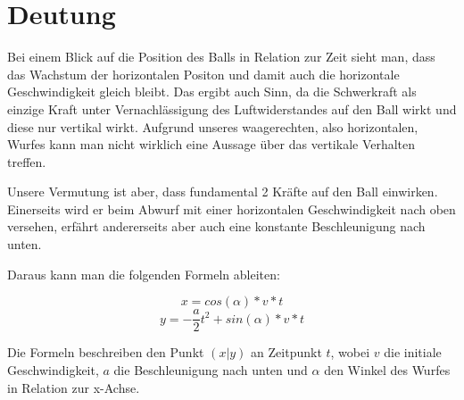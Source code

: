 \documentclass[8pt, letterpaper]{article}
\begin{document}
\begin{figure}[!htb]
\centering
{}
\end{figure}

\section{Deutung}
Bei einem Blick auf die Position des Balls in Relation zur Zeit sieht man, dass das Wachstum der horizontalen Positon und damit auch die horizontale Geschwindigkeit gleich bleibt. Das ergibt auch Sinn, da die Schwerkraft als einzige Kraft unter Vernachlässigung des Luftwiderstandes auf den Ball wirkt und diese nur vertikal wirkt. Aufgrund unseres waagerechten, also horizontalen, Wurfes kann man nicht wirklich eine Aussage über das vertikale Verhalten treffen.

Unsere Vermutung ist aber, dass fundamental 2 Kräfte auf den Ball einwirken. Einerseits wird er beim Abwurf mit einer horizontalen Geschwindigkeit nach oben versehen, erfährt andererseits aber auch eine konstante Beschleunigung nach unten.

Daraus kann man die folgenden Formeln ableiten:

\begin{equation}
x = cos(\alpha) * v * t
\end{equation}
\begin{equation}
y = -\frac{a}{2}t^{2} + sin(\alpha) * v * t
\end{equation}

Die Formeln beschreiben den Punkt $(x|y)$ an Zeitpunkt $t$, wobei $v$ die initiale Geschwindigkeit, $a$ die Beschleunigung nach unten und $\alpha$ den Winkel des Wurfes in Relation zur x-Achse.
\end{document}
